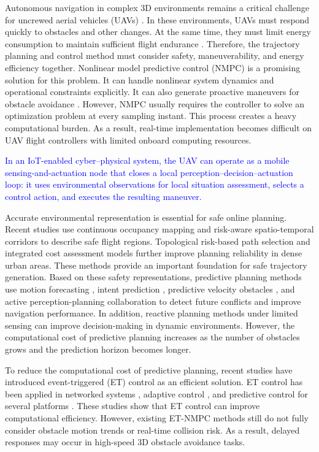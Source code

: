 \documentclass[lettersize,journal]{IEEEtran}
\begin{document}
Autonomous navigation in complex 3D environments remains a critical challenge for uncrewed aerial vehicles (UAVs) \cite{ref1}. In these environments, UAVs must respond quickly to obstacles and other changes. At the same time, they must limit energy consumption to maintain sufficient flight endurance \cite{ref2}. Therefore, the trajectory planning and control method must consider safety, maneuverability, and energy efficiency together. Nonlinear model predictive control (NMPC) is a promising solution for this problem. It can handle nonlinear system dynamics and operational constraints explicitly. It can also generate proactive maneuvers for obstacle avoidance \cite{ref3}. However, NMPC usually requires the controller to solve an optimization problem at every sampling instant. This process creates a heavy computational burden. As a result, real-time implementation becomes difficult on UAV flight controllers with limited onboard computing resources.

\textcolor{blue}{In an IoT-enabled cyber--physical system, the UAV can operate as a mobile sensing-and-actuation node that closes a local perception--decision--actuation loop: it uses environmental observations for local situation assessment, selects a control action, and executes the resulting maneuver.}

Accurate environmental representation is essential for safe online planning. Recent studies use continuous occupancy mapping \cite{ref4} and risk-aware spatio-temporal corridors \cite{ref5} to describe safe flight regions. Topological risk-based path selection \cite{ref6} and integrated cost assessment models \cite{ref7, ref8} further improve planning reliability in dense urban areas. These methods provide an important foundation for safe trajectory generation.
Based on these safety representations, predictive planning methods use motion forecasting \cite{ref9, ref10}, intent prediction \cite{ref11}, predictive velocity obstacles \cite{ref12, ref13}, and active perception-planning collaboration \cite{ref14} to detect future conflicts and improve navigation performance. In addition, reactive planning methods under limited sensing \cite{ref15, ref16} can improve decision-making in dynamic environments. However, the computational cost of predictive planning increases as the number of obstacles grows and the prediction horizon becomes longer.

To reduce the computational cost of predictive planning, recent studies have introduced event-triggered (ET) control as an efficient solution. ET control has been applied in networked systems \cite{ref17, ref18}, adaptive control \cite{ref19, ref20, ref21}, and predictive control for several platforms \cite{ref22, ref23, ref24, ref25}. These studies show that ET control can improve computational efficiency. However, existing ET-NMPC methods still do not fully consider obstacle motion trends or real-time collision risk. As a result, delayed responses may occur in high-speed 3D obstacle avoidance tasks.
\end{document}
